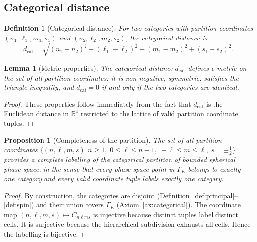 \documentclass[11pt,twocolumn,a4paper]{article}
\newtheorem{lemma}[theorem]{Lemma}
\newtheorem{proposition}[theorem]{Proposition}
\newtheorem{definition}{Definition}
\newcommand{\dcat}{d_{\mathrm{cat}}}
\newcommand{\R}{\mathbb{R}}
\newcommand{\phasespace}{\Gamma}
\begin{document}
\subsection{Categorical distance}

\begin{definition}[Categorical distance]\label{def:catdist}
For two categories with partition coordinates $(n_1, \ell_1, m_1, s_1)$ and $(n_2, \ell_2, m_2, s_2)$, the categorical distance is
\begin{equation}\label{eq:catdist}
\dcat = \sqrt{(n_1 - n_2)^2 + (\ell_1 - \ell_2)^2 + (m_1 - m_2)^2 + (s_1 - s_2)^2}.
\end{equation}
\end{definition}

\begin{lemma}[Metric properties]\label{lem:metric}
The categorical distance $\dcat$ defines a metric on the set of all partition coordinates: it is non-negative, symmetric, satisfies the triangle inequality, and $\dcat = 0$ if and only if the two categories are identical.
\end{lemma}
\begin{proof}
These properties follow immediately from the fact that $\dcat$ is the Euclidean distance in $\R^4$ restricted to the lattice of valid partition coordinate tuples.
\end{proof}

\begin{proposition}[Completeness of the partition]\label{prop:completeness}
The set of all partition coordinates $\{(n, \ell, m, s) : n \geq 1,\; 0 \leq \ell \leq n-1,\; -\ell \leq m \leq \ell,\; s = \pm\tfrac{1}{2}\}$ provides a complete labelling of the categorical partition of bounded spherical phase space, in the sense that every phase-space point in $\phasespace_E$ belongs to exactly one category and every valid coordinate tuple labels exactly one category.
\end{proposition}
\begin{proof}
By construction, the categories are disjoint (Definition~\ref{def:principal}--\ref{def:spin}) and their union covers $\phasespace_E$ (Axiom~\ref{ax:categorical}).
The coordinate map $(n, \ell, m, s) \mapsto C_{n\ell m s}$ is injective because distinct tuples label distinct cells.
It is surjective because the hierarchical subdivision exhausts all cells.
Hence the labelling is bijective.
\end{proof}


\end{document}
